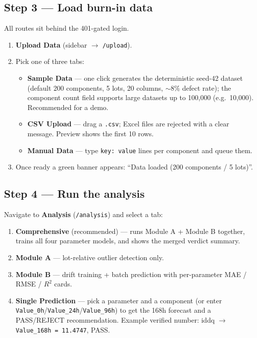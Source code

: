 \documentclass[11pt,a4paper]{article}
\newcommand{\code}[1]{\texttt{\small #1}}
\newcommand{\keys}[1]{\textbf{\sffamily#1}}
\begin{document}
\subsection*{Step 3 --- Load burn-in data}
All routes sit behind the 401-gated login.
\begin{enumerate}[leftmargin=1.5em]
  \item \keys{Upload Data} (sidebar $\rightarrow$ \code{/upload}).
  \item Pick one of three tabs:
    \begin{itemize}[leftmargin=1.5em]
      \item \keys{Sample Data} --- one click generates the deterministic seed-42 dataset
            (default 200 components, 5 lots, 20 columns, $\sim$8\% defect rate); the component
            count field supports large datasets up to 100{,}000 (e.g.\ 10{,}000). Recommended for a demo.
      \item \keys{CSV Upload} --- drag a \code{.csv}; Excel files are rejected with a clear
            message. Preview shows the first 10 rows.
      \item \keys{Manual Data} --- type \code{key: value} lines per component and queue them.
    \end{itemize}
  \item Once ready a green banner appears: ``Data loaded (200 components / 5 lots)''.
\end{enumerate}

\subsection*{Step 4 --- Run the analysis}
Navigate to \keys{Analysis} (\code{/analysis}) and select a tab:
\begin{enumerate}[leftmargin=1.5em]
  \item \keys{Comprehensive} (recommended) --- runs Module A + Module B together,
        trains all four parameter models, and shows the merged verdict summary.
  \item \keys{Module A} --- lot-relative outlier detection only.
  \item \keys{Module B} --- drift training + batch prediction with per-parameter
        MAE / RMSE / $R^2$ cards.
  \item \keys{Single Prediction} --- pick a parameter and a component (or enter
        \code{Value\_0h}/\code{Value\_24h}/\code{Value\_96h}) to get the 168h forecast and a
        PASS/REJECT recommendation. Example verified number: iddq $\rightarrow$
        \code{Value\_168h = 11.4747}, PASS.
\end{enumerate}
\end{document}
